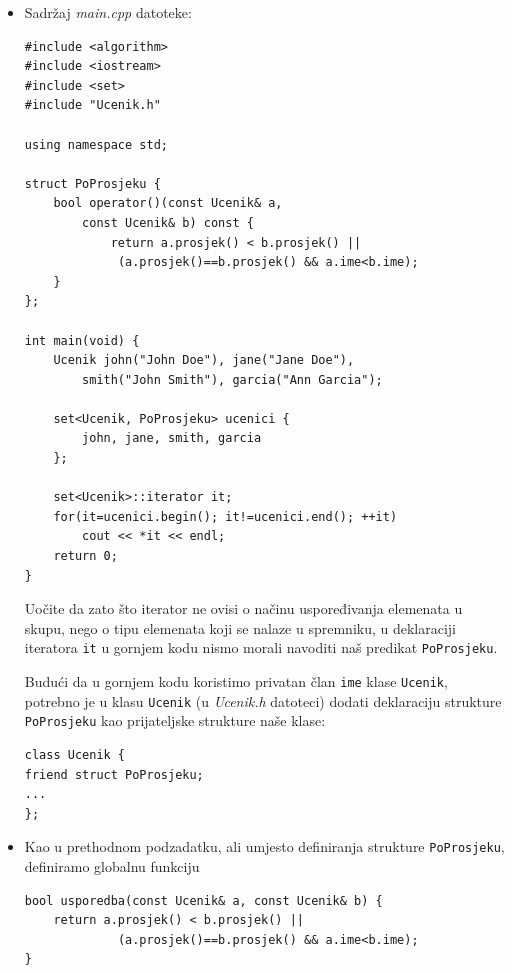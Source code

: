 \begin{rjesenje}
    \begin{itemize}
        \item[(a)]
        Sadržaj \textit{main.cpp} datoteke:
        \begin{verbatim}
#include <algorithm>
#include <iostream>
#include <set>
#include "Ucenik.h"

using namespace std;

struct PoProsjeku {
    bool operator()(const Ucenik& a, 
        const Ucenik& b) const {
            return a.prosjek() < b.prosjek() ||
             (a.prosjek()==b.prosjek() && a.ime<b.ime);
    }
};

int main(void) {
    Ucenik john("John Doe"), jane("Jane Doe"),
        smith("John Smith"), garcia("Ann Garcia");
    
    set<Ucenik, PoProsjeku> ucenici {
        john, jane, smith, garcia
    };
    
    set<Ucenik>::iterator it;
    for(it=ucenici.begin(); it!=ucenici.end(); ++it)
        cout << *it << endl;
    return 0;
}
        \end{verbatim}

        Uočite da zato što iterator ne ovisi o načinu uspoređivanja elemenata u skupu, nego o tipu elemenata koji se nalaze u spremniku,
        u deklaraciji iteratora \texttt{it} u gornjem kodu nismo morali navoditi naš predikat \texttt{PoProsjeku}.
        \medskip
        
        Budući da u gornjem kodu koristimo privatan član \texttt{ime} klase \texttt{Ucenik}, potrebno je u klasu \texttt{Ucenik} 
        (u \textit{Ucenik.h} datoteci)
    dodati deklaraciju strukture \texttt{PoProsjeku} kao prijateljske strukture naše klase:
    \begin{verbatim}
class Ucenik {
friend struct PoProsjeku;
...
};
    \end{verbatim}

    \item[(b)]
    Kao u prethodnom podzadatku, ali umjesto definiranja strukture \texttt{PoProsjeku},
    definiramo globalnu funkciju
    \begin{verbatim}
bool usporedba(const Ucenik& a, const Ucenik& b) {
    return a.prosjek() < b.prosjek() ||
             (a.prosjek()==b.prosjek() && a.ime<b.ime);
}
    \end{verbatim}


\end{itemize}
\end{rjesenje}
